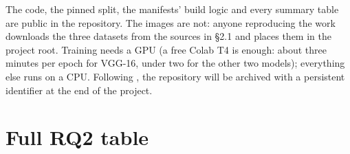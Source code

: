 \documentclass[11pt,a4paper]{article}
\begin{document}
The code, the pinned split, the manifests' build logic and every summary table are public in the repository. The images are not: anyone reproducing the work downloads the three datasets from the sources in \S{}2.1 and places them in the project root. Training needs a GPU (a free Colab T4 is enough: about three minutes per epoch for VGG-16, under two for the other two models); everything else runs on a CPU. Following \citet{dicosmo2026}, the repository will be archived with a persistent identifier at the end of the project.

\nocite{aiact2024,mdr2017}
\printbibliography[heading=ctbib,title=References]

\appendix
\setcounter{table}{0}

\clearpage
\section{Full RQ2 table}
\end{document}
